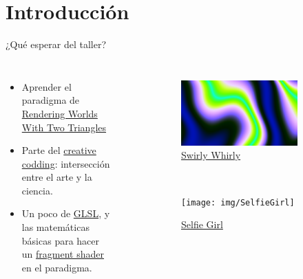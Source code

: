 \section{Introducción}
\begin{frame}{¿Qué esperar del taller?}
\begin{columns}
    \begin{itemize}
         \item Aprender el paradigma de \href{https://iquilezles.org/articles/nvscene2008/rwwtt.pdf}{Rendering Worlds With Two Triangles}
         \item Parte del \href{https://www.smu.edu/meadows/newsandevents/news/2023/what-is-creative-coding}{creative codding}: intersección entre el arte y la ciencia. 
         \item Un poco de \href{https://www.khronos.org/opengl/wiki/OpenGL_Shading_Language}{GLSL}, y las matemáticas básicas para hacer un \href{https://www.khronos.org/opengl/wiki/Portal:OpenGL_Shading_Language/Fragment_Shader}{fragment shader} en el paradigma.
     \end{itemize}
\begin{figure}[htp]
 \centering
 \begin{subfigure}[b]{0.42\textwidth}
   \includegraphics[width=\textwidth]{img/SwirlyWhirly}
   \caption{\href{https://www.shadertoy.com/view/X3dBRr}{Swirly Whirly}}
 \end{subfigure}
~
 \begin{subfigure}[b]{0.42\textwidth}
   \texttt{[image: img/SelfieGirl]}
   \caption{\href{https://www.shadertoy.com/view/WsSBzh}{Selfie Girl}}
 \end{subfigure}
\\
 \begin{subfigure}[b]{0.42\textwidth}

\end{subfigure}
\end{figure}
\end{columns}
\end{frame}

